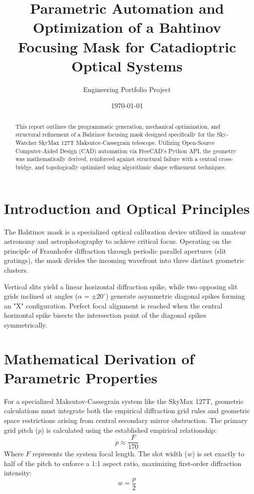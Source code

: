 \documentclass[11pt,a4paper]{article}
\title{Parametric Automation and Optimization of a Bahtinov Focusing Mask for Catadioptric Optical Systems}
\author{Engineering Portfolio Project}
\date{\today}
\begin{document}
\maketitle

\begin{abstract}
This report outlines the programmatic generation, mechanical optimization, and structural refinement of a Bahtinov focusing mask designed specifically for the Sky-Watcher SkyMax 127T Maksutov-Cassegrain telescope. Utilizing Open-Source Computer-Aided Design (CAD) automation via FreeCAD's Python API, the geometry was mathematically derived, reinforced against structural failure with a central cross-bridge, and topologically optimized using algorithmic shape refinement techniques.
\end{abstract}

\section{Introduction and Optical Principles}
The Bahtinov mask is a specialized optical calibration device utilized in amateur astronomy and astrophotography to achieve critical focus. Operating on the principle of Fraunhofer diffraction through periodic parallel apertures (slit gratings), the mask divides the incoming wavefront into three distinct geometric clusters. 

Vertical slits yield a linear horizontal diffraction spike, while two opposing slit grids inclined at angles ($\alpha = \pm 20^\circ$) generate asymmetric diagonal spikes forming an "X" configuration. Perfect focal alignment is reached when the central horizontal spike bisects the intersection point of the diagonal spikes symmetrically.

\section{Mathematical Derivation of Parametric Properties}
For a specialized Maksutov-Cassegrain system like the SkyMax 127T, geometric calculations must integrate both the empirical diffraction grid rules and geometric space restrictions arising from central secondary mirror obstruction. The primary grid pitch ($p$) is calculated using the established empirical relationship:
\begin{equation}
p \approx \frac{F}{170}
\end{equation}
Where $F$ represents the system focal length. The slot width ($w$) is set exactly to half of the pitch to enforce a 1:1 aspect ratio, maximizing first-order diffraction intensity:
\begin{equation}
w = \frac{p}{2}
\end{equation}
\end{document}
